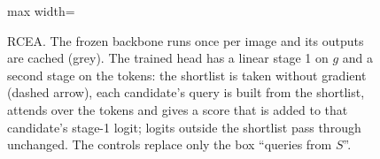 \documentclass[11pt,a4paper]{article}
\theoremstyle{plain}
\begin{document}
\begin{figure}[!htbp]
\begin{adjustbox}{max width=\textwidth}
\end{adjustbox}
\caption{RCEA. The frozen backbone runs once per image and its outputs are cached (grey). The trained head has a
linear stage 1 on $g$ and a second stage on the tokens: the shortlist is taken without gradient (dashed arrow), each
candidate's query is built from the shortlist, attends over the tokens and gives a score that is added to that
candidate's stage-1 logit; logits outside the shortlist pass through unchanged. The controls replace only the box
``queries from $S$''.}
\label{fig:pipeline}
\end{figure}
\end{document}
